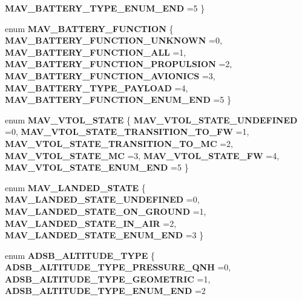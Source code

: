 \begin{DoxyCompactItemize}
\textbf{ M\+A\+V\+\_\+\+B\+A\+T\+T\+E\+R\+Y\+\_\+\+T\+Y\+P\+E\+\_\+\+E\+N\+U\+M\+\_\+\+E\+ND} =5
 \}
\item 
enum \textbf{ M\+A\+V\+\_\+\+B\+A\+T\+T\+E\+R\+Y\+\_\+\+F\+U\+N\+C\+T\+I\+ON} \{ \newline
\textbf{ M\+A\+V\+\_\+\+B\+A\+T\+T\+E\+R\+Y\+\_\+\+F\+U\+N\+C\+T\+I\+O\+N\+\_\+\+U\+N\+K\+N\+O\+WN} =0, 
\textbf{ M\+A\+V\+\_\+\+B\+A\+T\+T\+E\+R\+Y\+\_\+\+F\+U\+N\+C\+T\+I\+O\+N\+\_\+\+A\+LL} =1, 
\textbf{ M\+A\+V\+\_\+\+B\+A\+T\+T\+E\+R\+Y\+\_\+\+F\+U\+N\+C\+T\+I\+O\+N\+\_\+\+P\+R\+O\+P\+U\+L\+S\+I\+ON} =2, 
\textbf{ M\+A\+V\+\_\+\+B\+A\+T\+T\+E\+R\+Y\+\_\+\+F\+U\+N\+C\+T\+I\+O\+N\+\_\+\+A\+V\+I\+O\+N\+I\+CS} =3, 
\newline
\textbf{ M\+A\+V\+\_\+\+B\+A\+T\+T\+E\+R\+Y\+\_\+\+T\+Y\+P\+E\+\_\+\+P\+A\+Y\+L\+O\+AD} =4, 
\textbf{ M\+A\+V\+\_\+\+B\+A\+T\+T\+E\+R\+Y\+\_\+\+F\+U\+N\+C\+T\+I\+O\+N\+\_\+\+E\+N\+U\+M\+\_\+\+E\+ND} =5
 \}
\item 
enum \textbf{ M\+A\+V\+\_\+\+V\+T\+O\+L\+\_\+\+S\+T\+A\+TE} \{ \newline
\textbf{ M\+A\+V\+\_\+\+V\+T\+O\+L\+\_\+\+S\+T\+A\+T\+E\+\_\+\+U\+N\+D\+E\+F\+I\+N\+ED} =0, 
\textbf{ M\+A\+V\+\_\+\+V\+T\+O\+L\+\_\+\+S\+T\+A\+T\+E\+\_\+\+T\+R\+A\+N\+S\+I\+T\+I\+O\+N\+\_\+\+T\+O\+\_\+\+FW} =1, 
\textbf{ M\+A\+V\+\_\+\+V\+T\+O\+L\+\_\+\+S\+T\+A\+T\+E\+\_\+\+T\+R\+A\+N\+S\+I\+T\+I\+O\+N\+\_\+\+T\+O\+\_\+\+MC} =2, 
\textbf{ M\+A\+V\+\_\+\+V\+T\+O\+L\+\_\+\+S\+T\+A\+T\+E\+\_\+\+MC} =3, 
\newline
\textbf{ M\+A\+V\+\_\+\+V\+T\+O\+L\+\_\+\+S\+T\+A\+T\+E\+\_\+\+FW} =4, 
\textbf{ M\+A\+V\+\_\+\+V\+T\+O\+L\+\_\+\+S\+T\+A\+T\+E\+\_\+\+E\+N\+U\+M\+\_\+\+E\+ND} =5
 \}
\item 
enum \textbf{ M\+A\+V\+\_\+\+L\+A\+N\+D\+E\+D\+\_\+\+S\+T\+A\+TE} \{ \textbf{ M\+A\+V\+\_\+\+L\+A\+N\+D\+E\+D\+\_\+\+S\+T\+A\+T\+E\+\_\+\+U\+N\+D\+E\+F\+I\+N\+ED} =0, 
\textbf{ M\+A\+V\+\_\+\+L\+A\+N\+D\+E\+D\+\_\+\+S\+T\+A\+T\+E\+\_\+\+O\+N\+\_\+\+G\+R\+O\+U\+ND} =1, 
\textbf{ M\+A\+V\+\_\+\+L\+A\+N\+D\+E\+D\+\_\+\+S\+T\+A\+T\+E\+\_\+\+I\+N\+\_\+\+A\+IR} =2, 
\textbf{ M\+A\+V\+\_\+\+L\+A\+N\+D\+E\+D\+\_\+\+S\+T\+A\+T\+E\+\_\+\+E\+N\+U\+M\+\_\+\+E\+ND} =3
 \}
\item 
enum \textbf{ A\+D\+S\+B\+\_\+\+A\+L\+T\+I\+T\+U\+D\+E\+\_\+\+T\+Y\+PE} \{ \textbf{ A\+D\+S\+B\+\_\+\+A\+L\+T\+I\+T\+U\+D\+E\+\_\+\+T\+Y\+P\+E\+\_\+\+P\+R\+E\+S\+S\+U\+R\+E\+\_\+\+Q\+NH} =0, 
\textbf{ A\+D\+S\+B\+\_\+\+A\+L\+T\+I\+T\+U\+D\+E\+\_\+\+T\+Y\+P\+E\+\_\+\+G\+E\+O\+M\+E\+T\+R\+IC} =1, 
\textbf{ A\+D\+S\+B\+\_\+\+A\+L\+T\+I\+T\+U\+D\+E\+\_\+\+T\+Y\+P\+E\+\_\+\+E\+N\+U\+M\+\_\+\+E\+ND} =2

\end{DoxyCompactItemize}
